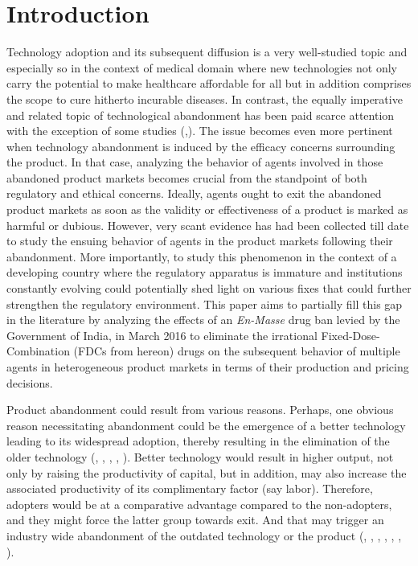 \documentclass[AER]{AEA}
\theoremstyle{theorem}
\begin{document}
\section{Introduction}

Technology adoption and its subsequent diffusion is a very well-studied topic and especially so in the context of medical domain where new technologies not only carry the potential to make healthcare affordable for all but in addition comprises the scope to cure hitherto incurable diseases. In contrast, the equally imperative and related topic of technological abandonment has been paid scarce attention with the exception of some studies (\cite{finkelstein1985scientific},\cite{greenwood2017and}). The issue becomes even more pertinent when technology abandonment is induced by the efficacy concerns surrounding the product. In that case, analyzing the behavior of agents involved in those abandoned product markets becomes crucial from the standpoint of both regulatory and ethical concerns. Ideally, agents ought to exit the abandoned product markets as soon as the validity or effectiveness of a product is marked as harmful or dubious. However, very scant evidence has had been collected till date to study the ensuing behavior of agents in the product markets following their abandonment. More importantly, to study this phenomenon in the context of a developing country where the regulatory apparatus is immature and institutions constantly evolving could potentially shed light on various fixes that could further strengthen the regulatory environment. This paper aims to partially fill this gap in the literature by analyzing the effects of an \textit{En-Masse} drug ban levied by the Government of India, in March 2016 to eliminate the irrational Fixed-Dose-Combination (FDCs from hereon) drugs on the subsequent behavior of multiple agents in heterogeneous product markets in terms of their production and pricing decisions.

Product abandonment could result from various reasons. Perhaps, one obvious reason necessitating abandonment could be the emergence of a  better technology leading to its widespread adoption, thereby resulting in the elimination of the older technology (\cite{gort1982time}, \cite{abrahamson1993institutional}, \cite{kennedy2009institutionalization}, \cite{venkatesh2003user}, \cite{kapoor2015complementarities}). Better technology would result in higher output, not only by raising the productivity of capital, but in addition, may also increase the associated productivity of its complimentary factor (say labor). Therefore, adopters would be at a comparative advantage compared to the non-adopters, and they might force the latter group towards exit. And that may trigger an industry wide abandonment of the outdated technology or the product (\cite{adner2010old}, \cite{adner2016innovation}, \cite{greer1981medical}, \cite{rogers2010diffusion}, \cite{2002technologies}, \cite{acemoglu2002directed}, \cite{christensen2013innovator}).
\end{document}
